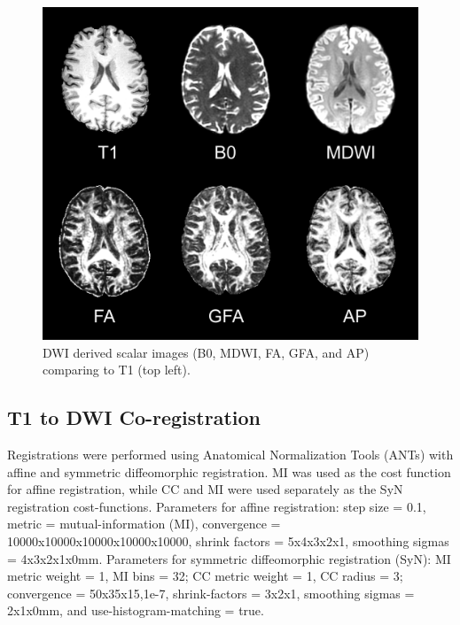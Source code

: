\begin{figure}[ht]
\includegraphics[width=\linewidth]{figure2}
\caption{DWI derived scalar images (B0, MDWI, FA, GFA, and AP) comparing to T1 (top left).}
\centering
\label{fig:APfigure2}
\end{figure}

\subsection{T1 to DWI Co-registration}
Registrations were performed using Anatomical Normalization Tools (ANTs) \cite{Avants2008b} with affine and symmetric diffeomorphic registration. MI was used as the cost function for affine registration, while CC and MI were used separately as the SyN registration cost-functions. Parameters for affine registration: step size = 0.1, metric = mutual-information (MI), convergence = 10000x10000x10000x10000x10000, shrink factors = 5x4x3x2x1, smoothing sigmas = 4x3x2x1x0mm. Parameters for symmetric diffeomorphic registration (SyN): MI metric weight = 1, MI bins = 32; CC metric weight = 1, CC radius = 3; convergence = 50x35x15,1e-7, shrink-factors = 3x2x1, smoothing sigmas = 2x1x0mm, and use-histogram-matching = true.

